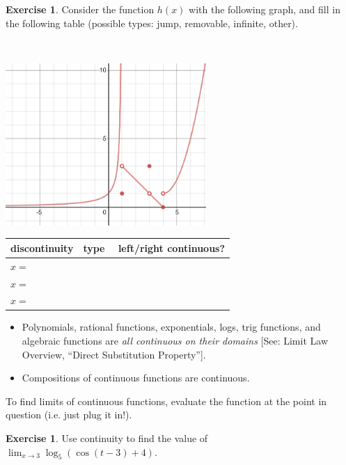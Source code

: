 \documentclass[11pt,reqno,final]{amsart}
\numberwithin{equation}{section}
\numberwithin{figure}{section}
\theoremstyle{definition} %
\newtheorem{exercise}[question]{Exercise}
\newcommand{\dlim}{\displaystyle\lim}
\begin{document}
\begin{exercise}
        Consider the function $h(x)$ with the following graph, and fill in the following table
        (possible types: jump, removable, infinite, other).

        $ $
        \begin{minipage}{.5\textwidth}
                \begin{center}
                        \includegraphics[width=3in]{09-23P_graphs3.png}
                \end{center}
        \end{minipage}
        \begin{minipage}{.5\textwidth}
                {\renewcommand{\arraystretch}{2}%
                  \begin{center}
                          \begin{tabular}{l|c|c}
                            discontinuity & \quad type \quad $ $& \quad left/right continuous? \\ \hline
                            $x=$ \qquad && \\
                            $x=$ && \\
                            $x=$ && \\ 
                          \end{tabular}
                  \end{center}
                }
        \end{minipage}
\end{exercise}

\begin{framed}
        \begin{itemize}
        \item Polynomials, rational functions, exponentials, logs, trig functions, and algebraic functions are \textit{all continuous on their domains} [See: Limit Law Overview, ``Direct Substitution Property''].
        \item Compositions of continuous functions are continuous.
        \end{itemize}
\end{framed}

To find limits of continuous functions, evaluate the function at the point in question (i.e. just plug it in!).

\begin{exercise}
        Use continuity to find the value of $\dlim_{x \to 3} \log_5(\cos(t-3)+4)$.
        \vfill
\end{exercise}
\end{document}
